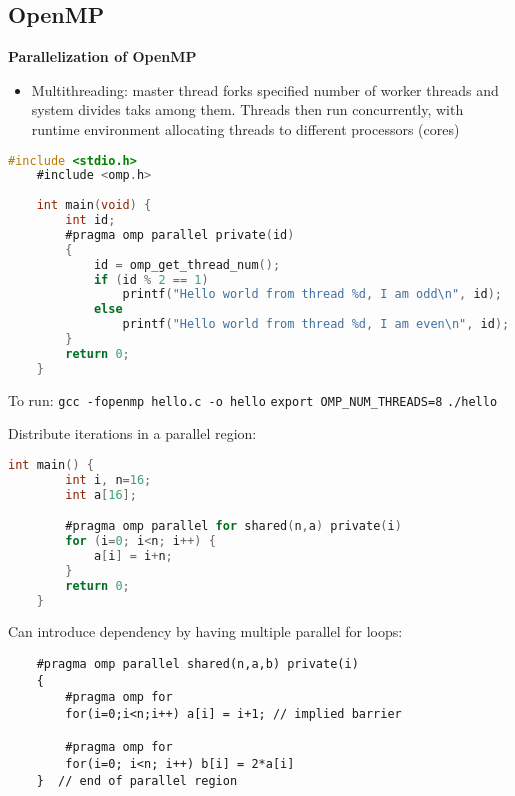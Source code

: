 \subsection{OpenMP}

\textbf{Parallelization of OpenMP}
\begin{itemize}
    \item Multithreading: master thread forks specified number of worker threads and system divides taks among them. Threads then run concurrently, with runtime environment allocating threads to different processors (cores)
\end{itemize}

\begin{lstlisting}[language=C]
    #include <stdio.h>
    #include <omp.h>
    
    int main(void) {
        int id;
        #pragma omp parallel private(id)
        {
            id = omp_get_thread_num();
            if (id % 2 == 1)
                printf("Hello world from thread %d, I am odd\n", id);
            else
                printf("Hello world from thread %d, I am even\n", id);
        }
        return 0;
    }
\end{lstlisting}

To run: 
\texttt{gcc -fopenmp hello.c -o hello}
\texttt{export OMP_NUM_THREADS=8}
\texttt{./hello}

Distribute iterations in a parallel region:
\begin{lstlisting}[language=C]
    int main() {
        int i, n=16;
        int a[16];

        #pragma omp parallel for shared(n,a) private(i)
        for (i=0; i<n; i++) {
            a[i] = i+n;
        }
        return 0;
    }
\end{lstlisting}

Can introduce dependency by having multiple parallel for loops:
\begin{lstlisting}
    #pragma omp parallel shared(n,a,b) private(i)
    {
        #pragma omp for
        for(i=0;i<n;i++) a[i] = i+1; // implied barrier

        #pragma omp for
        for(i=0; i<n; i++) b[i] = 2*a[i]
    }  // end of parallel region
\end{lstlisting}

